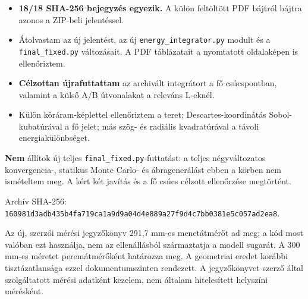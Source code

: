 \documentclass[10pt,a4paper]{article}
\begin{document}
{\par
\begin{itemize}\setlength{\itemsep}{0.5pt}\setlength{\parskip}{0pt}\setlength{\topsep}{1pt}
\item \textbf{18/18 SHA-256 bejegyzés egyezik.} A külön feltöltött PDF bájtról bájtra azonos a ZIP-beli jelentéssel.
\item Átolvastam az új jelentést, az új \texttt{energy\_integrator.py} modult és a \texttt{final\_fixed.py} változásait. A PDF táblázatait a nyomtatott oldalaképen is ellenőriztem.
\item \textbf{Célzottan újrafuttattam} az archivált integrátort a fő csúcspontban, valamint a külső A/B útvonalakat a releváns L-eknél.
\item Külön köráram-képlettel ellenőriztem a teret; Descartes-koordinátás Sobol-kubatúrával a fő jelet; más szög- és radiális kvadratúrával a távoli energiakülönbséget.
\end{itemize}
\par
\textbf{Nem} állítok új teljes \texttt{final\_fixed.py}-futtatást: a teljes négyváltozatos konvergencia-, statikus Monte Carlo- és ábragenerálást ebben a körben nem ismételtem meg. A kért két javítás és a fő csúcs célzott ellenőrzése megtörtént.
\par
Archív SHA-256: \texttt{160981d3adb435b4fa719ca1a9d9a04d4e889a27f9d4c7bb0381e5c057ad2ea8}.
\par
\vspace{2pt}\par\vspace{0.5pt}
\par
Az új, szerzői mérési jegyzőkönyv 291,7 mm-es menetátmérőt ad meg; a kód most valóban ezt használja, nem az ellenállásból származtatja a modell sugarát. A 300 mm-es méretet peremátmérőként határozza meg. A geometriai eredet korábbi tisztázatlansága ezzel dokumentumszinten rendezett. A jegyzőkönyvet szerző által szolgáltatott mérési adatként kezelem, nem általam hitelesített helyszíni mérésként.
\par
\begin{center}
\end{center}}
\end{document}
